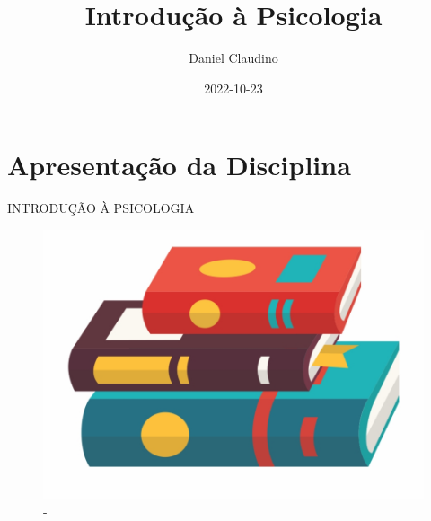 \documentclass[
]{book}
\title{Introdução à Psicologia}
\author{Daniel Claudino}
\date{2022-10-23}
\begin{document}
\maketitle

{
\setcounter{tocdepth}{1}
\tableofcontents
}
\hypertarget{apresentauxe7uxe3o-da-disciplina}{%
\chapter{Apresentação da Disciplina}\label{apresentauxe7uxe3o-da-disciplina}}

INTRODUÇÃO À PSICOLOGIA

\begin{figure}

{\centering \includegraphics[width=0.5\linewidth]{figuras/LIVRO-GENERICO} 

}

\caption{-}\label{fig:unnamed-chunk-1}
\end{figure}
\end{document}
